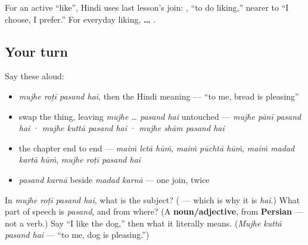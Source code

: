 For an active \textquotedblleft{}like\textquotedblright{}, Hindi uses last lesson's join: \textbf{ }, \textquotedblleft{}to do liking,\textquotedblright{} nearer to \textquotedblleft{}I choose, I prefer.\textquotedblright{} For everyday liking, \textbf{ …  }.

\subsection*{Your turn}
Say these aloud:

\begin{itemize}
\raggedright
  \item \emph{mujhe roṭī pasand hai}, then the Hindi meaning — \textquotedblleft{}to me, bread is pleasing\textquotedblright{}
  \item swap the thing, leaving \emph{mujhe … pasand hai} untouched — \emph{mujhe pānī pasand hai} · \emph{mujhe kuttā pasand hai} · \emph{mujhe shām pasand hai}
  \item the chapter end to end — \emph{maiṁ letā hūṁ}, \emph{maiṁ pūchtā hūṁ}, \emph{maiṁ madad kartā hūṁ}, \emph{mujhe roṭī pasand hai}
  \item \emph{pasand karnā} beside \emph{madad karnā} — one join, twice
\end{itemize}

\begin{tcolorbox}[breakable,colback=teal!4,colframe=teal!35!black,title={Before you move on}]
In \emph{mujhe roṭī pasand hai}, what is the subject? (\textbf{} — which is why it is \emph{hai}.) What part of speech is \emph{pasand}, and from where? (A \textbf{noun/adjective}, from \textbf{Persian} — not a verb.) Say \textquotedblleft{}I like the dog,\textquotedblright{} then what it literally means. (\emph{Mujhe kuttā pasand hai} — \textquotedblleft{}to me, dog is pleasing.\textquotedblright{})
\end{tcolorbox}
